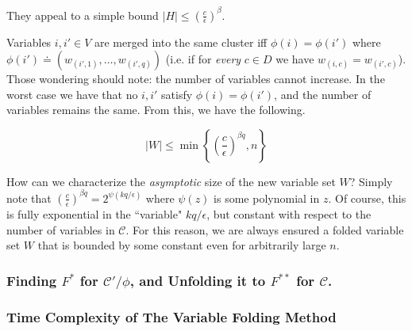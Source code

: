 \documentclass[letterpaper, 12pt]{article}
\numberwithin{equation}{section}
\begin{document}
\begin{algorithm}
\end{algorithm}
They appeal to a simple bound $|H| \leq \left(\frac{c}{\epsilon}\right)^\beta$.


Variables $i,i' \in V$ are merged into the same cluster iff $\phi(i) = \phi(i')$ where $\phi(i') \doteq (w_{(i',1)},\ldots,w_{(i',q)})$ (i.e. if for \textit{ every } $c\in D$ we have $w_{(i,c)} = w_{(i',c)}$). Those wondering should note: the number of variables cannot increase. In the worst case we have that no $i,i'$ satisfy $\phi(i) = \phi(i')$, and the number of variables remains the same. From this, we have the following.

\begin{equation}
|W| \leq \min\left\{\left(\frac{c}{\epsilon}\right)^{\beta q}, n \right\} 
\end{equation}

How can we characterize the \textit{asymptotic} size of the new variable set $W$? Simply note that $\left(\frac{c}{\epsilon}\right)^{\beta q} = 2^{\psi(kq/\epsilon)}$ where $\psi(z)$ is some polynomial in $z$. Of course, this is fully exponential in the ``variable" $kq/\epsilon$, but constant with respect to the number of variables in $\mathcal{C}$. For this reason, we are always ensured a folded variable set $W$ that is bounded by some constant even for arbitrarily large $n$.
\subsubsection{Finding $F^*$ for $\mathcal{C}'/\phi$, and Unfolding it to $F^{**}$ for $\mathcal{C}$.}

\subsubsection{Time Complexity of The Variable Folding Method}
\end{document}

